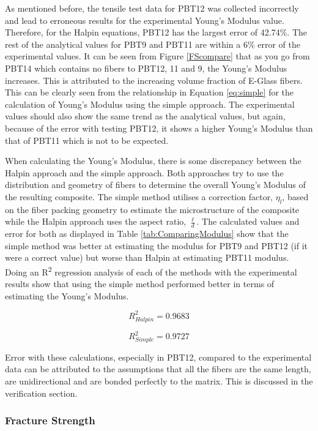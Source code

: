 \documentclass[11pt]{article}
\begin{document}
As mentioned before, the tensile test data for PBT12 was collected incorrectly and lead to erroneous results for the experimental Young's Modulus value. Therefore, for the Halpin equations, PBT12 has the largest error of 42.74\%. The rest of the analytical values for PBT9 and PBT11 are within a 6\% error of the experimental values. It can be seen from Figure \ref{FScompare} that as you go from PBT14 which contains no fibers to PBT12, 11 and  9, the Young's Modulus increases. This is attributed to the increasing volume fraction of E-Glass fibers. This can be clearly seen from the relationship in Equation \ref{eq:simple} for the calculation of Young's Modulus using the simple approach. The experimental values should also show the same trend as the analytical values, but again, because of the error with testing PBT12, it shows a higher Young's Modulus than that of PBT11 which is not to be expected. 

When calculating the Young's Modulus, there is some discrepancy between the Halpin approach and the simple approach. Both approaches try to use the distribution and geometry of fibers to determine the overall Young's Modulus of the resulting composite. The simple method utilises a correction factor, \(\eta_l\), based on the fiber packing geometry to estimate the microstructure of the composite while the Halpin approach uses the aspect ratio, \(\frac{\ell}{d}\). The calculated values and error for both as displayed in Table \ref{tab:ComparingModulus} show that the simple method was better at estimating the modulus for PBT9 and PBT12 (if it were a correct value) but worse than Halpin at estimating PBT11 modulus. Doing an R\textsuperscript{2} regression analysis of each of the methods with the experimental results show that using the simple method performed better in terms of estimating the Young's Modulus.

\begin{equation}
R^2_{Halpin} = 0.9683
\end{equation}

\begin{equation}
R^2_{Simple} = 0.9727
\end{equation}

Error with these calculations, especially in PBT12, compared to the experimental data can be attributed to the assumptions that all the fibers are the same length, are unidirectional and are bonded perfectly to the matrix. This is discussed in the verification section.

\subsubsection{Fracture Strength}
\end{document}
